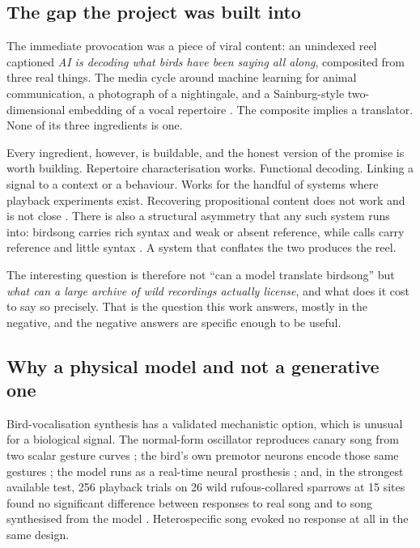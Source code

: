 \documentclass[10pt,twocolumn,a4paper]{article}
\begin{document}
\subsection*{The gap the project was built into}

The immediate provocation was a piece of viral content: an unindexed reel captioned
\emph{AI is decoding what birds have been saying all along}, composited from three real
things. The media cycle around machine learning for animal communication, a photograph
of a nightingale, and a Sainburg-style two-dimensional embedding of a vocal
repertoire \citep{sainburg2020}. The composite implies a translator. None of its three
ingredients is one.

Every ingredient, however, is buildable, and the honest version of the promise is worth
building. Repertoire characterisation works. Functional decoding. Linking a signal to a
context or a behaviour. Works for the handful of systems where playback experiments
exist. Recovering propositional content does not work and is not close
\citep{rutz2023}. There is also a structural asymmetry that any such system runs into:
birdsong carries rich syntax and weak or absent reference, while calls carry reference and
little syntax \citep{patelgrosz2023}. A system that conflates the two produces the reel.

The interesting question is therefore not ``can a model translate birdsong'' but
\emph{what can a large archive of wild recordings actually license}, and what does it cost
to say so precisely. That is the question this work answers, mostly in the negative, and
the negative answers are specific enough to be useful.

\subsection*{Why a physical model and not a generative one}

Bird-vocalisation synthesis has a validated mechanistic option, which is unusual for a
biological signal. The normal-form oscillator reproduces canary song from two scalar
gesture curves \citep{gardner2001}; the bird's own premotor neurons encode those same
gestures \citep{amador2013}; the model runs as a real-time neural
prosthesis \citep{arneodo2012}; and, in the strongest available test, 256 playback trials
on 26 wild rufous-collared sparrows at 15 sites found no significant difference between
responses to real song and to song synthesised from the
model \citep{bistel2024}. Heterospecific song evoked no response at all in the same
design.
\end{document}
